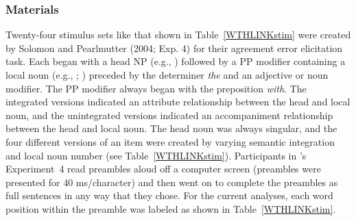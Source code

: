 \documentclass[12pt,titlepage]{article}
\begin{document}
\subsubsection{Materials} Twenty-four stimulus sets like that shown in Table~\ref{WTHLINKstim} were created by Solomon and Pearlmutter (2004; Exp. 4) for their agreement error elicitation task.  Each began with a head NP (e.g., ) followed by a PP modifier containing a local noun (e.g., ; ) preceded by the determiner \textit{the} and an adjective or noun modifier.  The PP modifier always began with the preposition \textit{with}. The integrated versions indicated an attribute relationship between the head and local noun, and the unintegrated versions indicated an accompaniment relationship between the head and local noun. The head noun
was always singular, and the four different versions of an item were
created by varying semantic integration and local noun number (see Table~\ref{WTHLINKstim}). Participants in \citeauthor{SolomonPearlmutter04}'s \citeyear{SolomonPearlmutter04} Experiment~4 read preambles aloud off a computer screen (preambles were presented for 40 ms/character) and then went on to complete the preambles as full sentences in any way that they chose.  For the current analyses, each word position within the preamble was labeled as shown in  Table~\ref{WTHLINKstim}.
\end{document}
